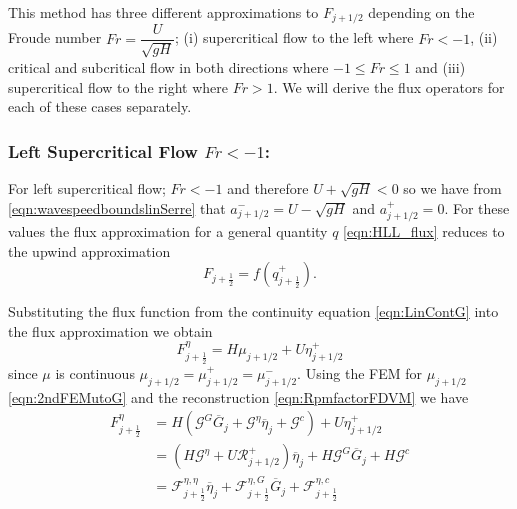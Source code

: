 This method has three different approximations to $F_{j+1/2}$ depending on the Froude number $Fr = \dfrac{U}{\sqrt{gH}}$; (i)
supercritical flow to the left where $Fr < -1$, (ii) critical and subcritical flow in both directions where $-1 \le Fr \le 1$ and (iii) supercritical flow to the right where $Fr > 1$. We will derive the flux operators for each of these cases separately.

\subsubsection{Left Supercritical Flow $Fr < -1$:}
For left supercritical flow; $Fr < -1$ and therefore $U + \sqrt{g H} < 0$ so we have from \eqref{eqn:wavespeedboundslinSerre} that $a^-_{j+ 1/2} = U - \sqrt{g H}$ and $a^+_{j+ 1/2} =  0$. For these values the flux approximation for a general quantity $q$ \eqref{eqn:HLL_flux} reduces to the upwind approximation 
\begin{equation}
F_{j+\frac{1}{2}} = f\left(q^+_{j+\frac{1}{2}}\right).
\label{eqn:fluxleftsupercrit}
\end{equation}

Substituting the flux function from the continuity equation \eqref{eqn:LinContG} into the flux approximation we obtain
\begin{equation*}
F^\eta_{j+\frac{1}{2}} = H \mu_{j+1/2} + U \eta^+_{j+1/2}
\end{equation*}
since $\mu$ is continuous $\mu_{j+1/2} = \mu_{j+1/2}^+ = \mu_{j+1/2}^- $. Using the FEM for $\mu_{j+1/2}$ \eqref{eqn:2ndFEMutoG} and the reconstruction \eqref{eqn:RpmfactorFDVM} we have
\begin{align}
F^\eta_{j+\frac{1}{2}} &= H \left(\mathcal{G}^G \overline{G}_{j} + \mathcal{G}^{\eta} \overline{\eta}_{j} + \mathcal{G}^c\right) + U \eta^+_{j+1/2} \nonumber \\ &= \left(H \mathcal{G}^{\eta} + U \mathcal{R}^+_{j+1/2} \right)  \overline{\eta}_{j} + H \mathcal{G}^G \overline{G}_{j} + H\mathcal{G}^c \nonumber \\
&= \mathcal{F}^{\eta, \eta}_{j+\frac{1}{2}} \overline{\eta}_{j} + \mathcal{F}^{\eta, G}_{j+\frac{1}{2}} \overline{G}_{j} + \mathcal{F}^{\eta, c}_{j+\frac{1}{2}}
\label{eqn:Fluxfactorsupercritetaleft}
\end{align}

